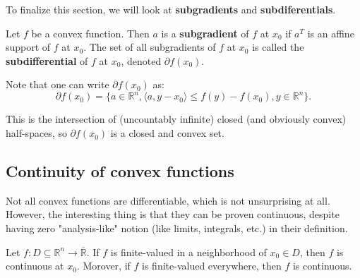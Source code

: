 To finalize this section, we will look at \textbf{subgradients} and
\textbf{subdiferentials}.

\begin{definition}
\label{def:Subgradients and subdifferentials}
  Let \( f \) be a convex function. Then \( a \) is a \textbf{subgradient} of \(
  f\) at \( x_{0} \) if \( a^{T} \) is an affine support of \( f \) at \( x_{0} \).
  The set of all subgradients of \( f \) at \( x_{0} \) is called the
  \textbf{subdifferential} of \( f \) at \( x_{0} \), denoted \( \partial
  f(x_{0}) \).
\end{definition}

Note that one can write \( \partial f(x_{0}) \) as:
\[
  \partial f(x_{0}) = \{a \in \mathbb{R}^{n}, \langle a, y - x_{0} \rangle \le f(y)
  - f(x_{0}), y \in \mathbb{R}^{n}\}  
.\]

This is the intersection of (uncountably infinite) closed (and obviously convex)
half-spaces, so \( \partial f(x_{0}) \) is a closed and convex set.


\subsection{Continuity of convex functions} %
\label{sub:Continuity of convex functions}

Not all convex functions are differentiable, which is not unsurprising at all.
However, the interesting thing is that they can be proven continuous, despite
having zero "analysis-like" notion (like limits, integrals, etc.) in their
definition.

\begin{theorem}
  Let \( f: D \subseteq \mathbb{R}^{n} \to \overline{\mathbb{R}}  \).
  If \( f \) is finite-valued in a neighborhood of \( x_{0} \in D \), then \( f
  \) is continuous at \( x_{0} \). Morover, if \( f \) is finite-valued
  everywhere, then \( f \) is continuous.
\end{theorem}

